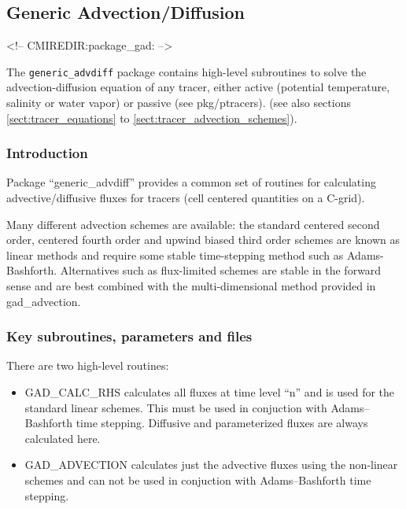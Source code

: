 

\subsection{Generic Advection/Diffusion}
\label{sec:pkg:gad}
\begin{rawhtml}
<!-- CMIREDIR:package_gad: -->
\end{rawhtml}

The {\tt generic\_advdiff} package contains high-level
subroutines to solve the advection-diffusion equation
of any tracer, either active (potential temperature,
salinity or water vapor) or passive (see pkg/ptracers).
(see also sections \ref{sect:tracer_equations} to
\ref{sect:tracer_advection_schemes}).


\subsubsection{Introduction}
Package ``generic\_advdiff'' provides a common set of routines for
calculating advective/diffusive fluxes for tracers (cell centered
quantities on a C-grid).

Many different advection schemes are available: the standard centered
second order, centered fourth order and upwind biased third order
schemes are known as linear methods and require some stable
time-stepping method such as Adams-Bashforth. Alternatives such as
flux-limited schemes are stable in the forward sense and are best
combined with the multi-dimensional method provided in gad\_advection.

\subsubsection{Key subroutines, parameters and files}
\label{sec:pkg:gad:implementation_synopsis}
There are two high-level routines:
\begin{itemize}
\item{GAD\_CALC\_RHS} calculates all fluxes at time level ``n'' and is
  used for the standard linear schemes. This must be used in
  conjuction with Adams--Bashforth time stepping. Diffusive and
  parameterized fluxes are always calculated here.

\item{GAD\_ADVECTION} calculates just the advective fluxes using the
  non-linear schemes and can not be used in conjuction with
  Adams--Bashforth time stepping.
\end{itemize}

